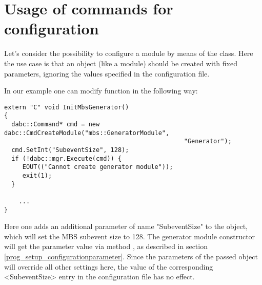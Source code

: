 \section{Usage of commands for configuration}
\label{prog_setup_configuration_commands}
Let's consider the possibility to configure a module by means of the  class.
Here the use case is that
an object (like a module) should be created with fixed parameters,
ignoring the values specified in the configuration file.

In our example one can modify  function in the following way:
\begin{small}
\begin{verbatim}
extern "C" void InitMbsGenerator() 
{
  dabc::Command* cmd = new dabc::CmdCreateModule("mbs::GeneratorModule", 
                                                 "Generator");
  cmd.SetInt("SubeventSize", 128);
  if (!dabc::mgr.Execute(cmd)) {
     EOUT(("Cannot create generator module"));
     exit(1);
  }
    
    ...
}
\end{verbatim}
\end{small}

Here one adds an additional parameter of name "SubeventSize" to
the  object, 
which will set the MBS subevent size to 128. 
The generator module constructor will get the parameter value via method
, as described in section \ref{prog_setup_configurationparameter}.
Since the parameters of the passed  object will override all other settings here,
the value of the corresponding <SubeventSize> entry in the configuration file has no effect.

